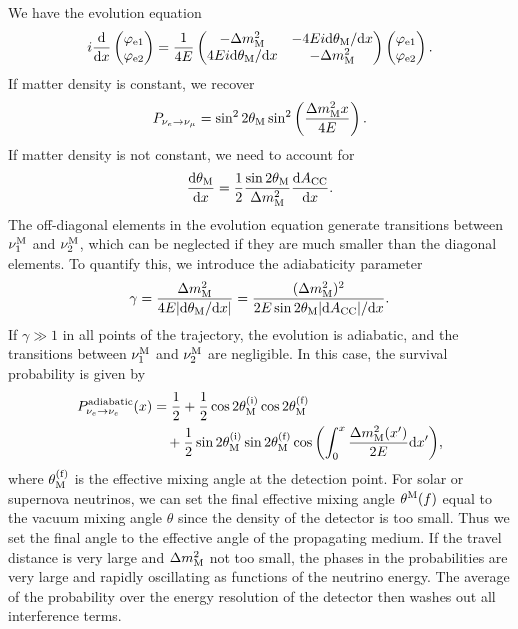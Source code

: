 \documentclass[twocolumn]{article}
\begin{document}
We have the evolution equation
\begin{align*}
  i \dv{}{x} \begin{pmatrix} \varphi_\t{e1} \\ \varphi_\t{e2} \end{pmatrix} 
  = \frac{1}{4E} \begin{pmatrix} -\dm_\t{M} & -4Ei \dd \theta_\t{M} / \dd x \\
                                 4Ei \dd \theta_\t{M} / \dd x & -\dm_\t{M}  
                 \end{pmatrix}
                 \begin{pmatrix} \varphi_\t{e1} \\ \varphi_\t{e2}  \end{pmatrix} 
.\end{align*} 
If matter density is constant, we recover 
\begin{align*}
  P_{\nu_{e} \to \nu_{\mu}} = \sin^2 2 \theta_{\t{M}} \sin^2 \left( \frac{\dm_{\t{M}}x}{4E} \right)
.\end{align*}
If matter density is not constant, we need to account for 
\begin{align*}
  \dv{\theta_\t{M}}{x} = \frac{1}{2} \frac{\sin 2\theta_\t{M}}{\dm_\t{M}} \dv{A_\t{CC}}{x}
.\end{align*}
The off-diagonal elements in the evolution equation generate transitions between $\nu_{1}^{\text{{M}}}$ and $\nu_{2}^{\text{{M}}}$, which can be neglected if they are much smaller than the diagonal elements. To quantify this, we introduce the adiabaticity parameter
\begin{align*}
  \gamma = \frac{\dm_\t{M}}{4E \abs{\dd \theta_\t{M} / \dd x}} = \frac{(\dm_\t{M})^2}{2E \sin 2\theta_\t{M} \abs{\dd A_\t{CC}} / \dd x}
.\end{align*}
If $\gamma \gg 1$ in all points of the trajectory, the evolution is adiabatic, and the transitions between $\nu_1^{\text{{M}}}$ and $\nu_2^{\text{{M}}}$ are negligible. In this case, the survival probability is given by
\begin{align*}
  P^\t{adiabatic}_{\ne \to \ne}(x) &= \frac{1}{2} + \frac{1}{2} \cos 2\theta_\t{M}^\t{(i)} \cos 2\theta_\t{M}^\t{(f)} \\
                                       & \quad + \frac{1}{2} \sin 2\theta_\t{M}^\t{(i)} \sin 2\theta_\t{M}^\t{(f)} \cos{\left(\int_0^x \frac{\dm_\t{M}(x')}{2E} \dd x' \right)}
,\end{align*}
where $\theta_{\text{{M}}}^{\text{{(f)}}}$ is the effective mixing angle at the detection point.
For solar or supernova neutrinos, we can set the final effective mixing angle $\thm{(f)}$ equal to the vacuum mixing angle $\theta$ since the density of the detector is too small. Thus we set the final angle to the effective angle of the propagating medium. If the travel distance is very large and $\dm_\t{M}$ not too small, the phases in the probabilities are very large and rapidly oscillating as functions of the neutrino energy. The average of the probability over the energy resolution of the detector then washes out all interference terms. 
\end{document}
